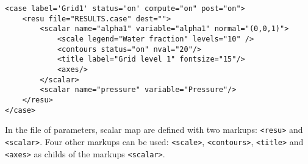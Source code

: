\documentclass[a4paper,10pt,twoside]{csshortdoc}
\begin{document}
\small
\begin{verbatim}
<case label='Grid1' status='on' compute="on" post="on">
    <resu file="RESULTS.case" dest="">
        <scalar name="alpha1" variable="alpha1" normal="(0,0,1)">
            <scale legend="Water fraction" levels="10" />
            <contours status="on" nval="20"/>
            <title label="Grid level 1" fontsize="15"/>
            <axes/>
        </scalar>
        <scalar name="pressure" variable="Pressure"/>
    </resu>
</case>
\end{verbatim}
\normalsize

In the file of parameters, scalar map are defined with two markups:
\texttt{<resu>} and \texttt{<scalar>}. Four other markups can be used:
\texttt{<scale>}, \texttt{<contours>}, \texttt{<title>} and \texttt{<axes>} as
childs of the markups \texttt{<scalar>}.
\end{document}
